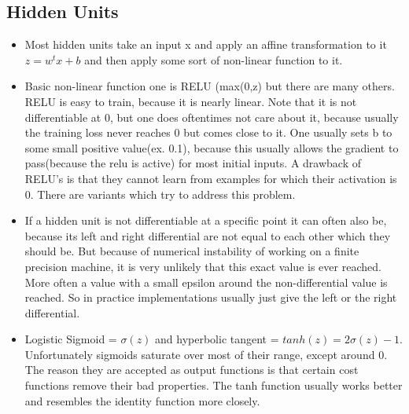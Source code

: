 \documentclass[a4paper]{article}
\begin{document}
\subsection{Hidden Units}
\begin{itemize}
\item Most hidden units take an input x and apply an affine transformation to it $z = w^tx+b$ and then apply some sort of non-linear function to it. 
\item Basic non-linear function one is RELU (max(0,z) but there are many others. RELU is easy to train, because it is nearly linear.  Note that it is not differentiable at 0, but one does oftentimes not care about it, because usually the training loss never reaches 0 but comes close to it. One usually sets b to some small positive value(ex. 0.1), because this usually allows the gradient to pass(because the relu is active) for most initial inputs. 
A drawback of RELU's is that they cannot learn from examples for which their activation is 0. There are variants which try to address this problem. 
\item If a hidden unit is not differentiable at a specific point it can often also be, because its  left and right differential are not equal to each other which they should be. But because of numerical instability of working on a finite precision machine, it is very unlikely that this exact value is ever reached. More often a  value with a small epsilon around the non-differential value is reached. So in practice implementations usually just give the left or the right differential. 

\item Logistic Sigmoid = $\sigma(z)$ and hyperbolic tangent = $tanh(z) = 2\sigma(z) -1$. Unfortunately sigmoids saturate over most of their range, except around 0. The reason they are accepted as output functions is that certain cost functions remove their bad properties. The tanh function usually works better and resembles the identity function more closely. 
\end{itemize}
\end{document}
